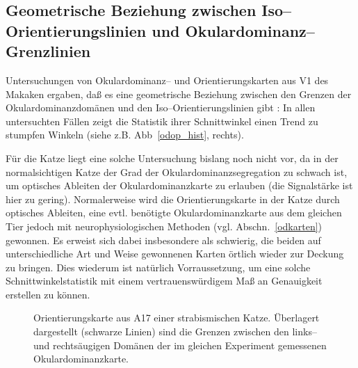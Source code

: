 \subsection[Geometrische Beziehung zwischen
Iso--Orientierungslinien$\ldots$]{Geometrische Beziehung zwischen
Iso--Orientierungslinien und Oku\-lar\-do\-minanz--Grenzlinien}
\label{90grad}

Untersuchungen von Okulardominanz-- und Orientierungskarten aus V1 des
Makaken ergaben, daß es eine geometrische Beziehung zwischen den Grenzen
der Okulardominanzdomänen und den Iso--Orientierungslinien gibt
\cite{bartfield:1992,oby:1993b}: In allen untersuchten Fällen zeigt die
Statistik ihrer Schnittwinkel einen Trend zu stumpfen Winkeln (siehe
z.B. Abb~\ref{odop_hist}, rechts).

Für die Katze liegt eine solche Untersuchung bislang noch nicht vor, da in
der normalsichtigen Katze der Grad der Okulardominanzsegregation zu schwach
ist, um optisches Ableiten der Okulardominanzkarte zu erlauben (die
Signalstärke ist hier zu gering). Normalerweise wird die
Orientierungskarte in der Katze durch optisches Ableiten, eine
evtl. benötigte Okulardominanzkarte aus dem gleichen Tier jedoch mit
neurophysiologischen Methoden (vgl. Abschn.~\ref{odkarten}) gewonnen. Es
erweist sich dabei insbesondere als schwierig, die beiden auf
unterschiedliche Art und Weise gewonnenen Karten örtlich wieder zur
Deckung zu bringen. Dies wiederum ist natürlich Vorraussetzung, um eine
solche Schnittwinkelstatistik mit einem vertrauenswürdigem Maß an
Genauigkeit erstellen zu können.

\begin{figure}[t]
\begin{center}
\end{center}
\caption{Orientierungskarte aus A17 einer strabismischen Katze. Überlagert
dargestellt (schwarze Linien) sind die Grenzen zwischen den links-- und
rechtsäugigen Domänen der im gleichen Experiment gemessenen
Okulardominanzkarte.}
\label{odop_pict}
\end{figure}

